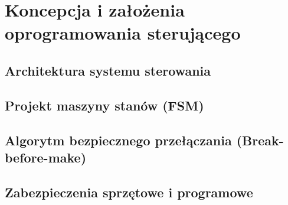 \chapter{Koncepcja i założenia oprogramowania sterującego}
\label{chap:zalozenia_fsm}

\section{Architektura systemu sterowania}

\section{Projekt maszyny stanów (FSM)}

\section{Algorytm bezpiecznego przełączania (Break-before-make)}

\section{Zabezpieczenia sprzętowe i programowe}
